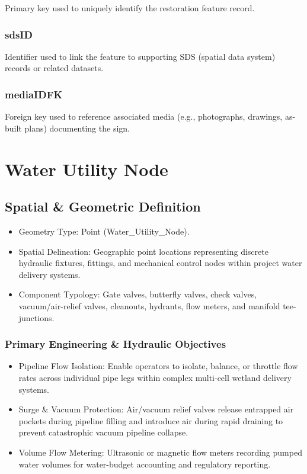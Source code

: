 \documentclass[
  letterpaper,
  DIV=11,
  numbers=noendperiod]{scrreprt}
\begin{document}
Primary key used to uniquely identify the restoration feature record.

\subsection{sdsID}\label{sdsid-24}

Identifier used to link the feature to supporting SDS (spatial data
system) records or related datasets.

\subsection{mediaIDFK}\label{mediaidfk-22}

Foreign key used to reference associated media (e.g., photographs,
drawings, as-built plans) documenting the sign.

\chapter{Water Utility Node}\label{water-utility-node}

\section{Spatial \& Geometric
Definition}\label{spatial-geometric-definition-25}

\begin{itemize}
\item
  Geometry Type: Point (Water\_Utility\_Node).
\item
  Spatial Delineation: Geographic point locations representing discrete
  hydraulic fixtures, fittings, and mechanical control nodes within
  project water delivery systems.
\item
  Component Typology: Gate valves, butterfly valves, check valves,
  vacuum/air-relief valves, cleanouts, hydrants, flow meters, and
  manifold tee-junctions.
\end{itemize}

\subsection{Primary Engineering \& Hydraulic
Objectives}\label{primary-engineering-hydraulic-objectives}

\begin{itemize}
\item
  Pipeline Flow Isolation: Enable operators to isolate, balance, or
  throttle flow rates across individual pipe legs within complex
  multi-cell wetland delivery systems.
\item
  Surge \& Vacuum Protection: Air/vacuum relief valves release entrapped
  air pockets during pipeline filling and introduce air during rapid
  draining to prevent catastrophic vacuum pipeline collapse.
\item
  Volume Flow Metering: Ultrasonic or magnetic flow meters recording
  pumped water volumes for water-budget accounting and regulatory
  reporting.
\end{itemize}
\end{document}
